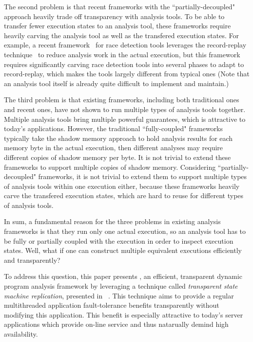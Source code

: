 The second problem is that recent frameworks with the ``partially-decoupled"
approach heavily trade off transparency with analysis tools. To be able to
transfer fewer execution states to an analysis tool, these frameworks require
heavily carving the analysis tool as well as the transfered execution states.
For example, a recent framework~\cite{wester:parallelizing:asplos13} for race
detection tools leverages the record-replay
technique~\cite{scribe:sigmetrics2010, respec:asplos10, racepro:sosp11} to
reduce analysis work in the actual execution, but this framework
requires significantly carving race detection tools into several phases to adapt
to record-replay, which makes the tools largely different from typical ones
(Note that an analysis tool itself is already quite difficult to implement and
maintain.)


The third problem is that existing frameworks, including both traditional ones
and recent ones, have not shown to run multiple types of analysis tools 
together. Multiple analysis tools bring multiple powerful
guarantees, which is attractive to today's applications. However, the
traditional ``fully-coupled" frameworks typically take the shadow memory 
approach to hold analysis results for each memory byte in the actual execution, 
then different analyses may require different copies of shadow memory per byte. 
It is not trivial to extend these frameworks to support multiple copies of 
shadow memory. Considering ``partially-decoupled" frameworks, it is not trivial 
to extend them to support multiple types of analysis tools within one execution 
either, because these frameworks heavily carve the transfered execution states, 
which are hard to reuse for different types of analysis tools.


In sum, a fundamental reason for the three problems in existing analysis 
frameworks is that they run only one actual execution, so an analysis tool has
to be fully or partially coupled with the execution in order to inspect
execution states. Well, what if one can construct multiple equivalent
executions efficiently and transparently?




To address this question, this paper presents \xxx, an efficient, 
transparent dynamic program analysis framework by leveraging a technique called 
\emph{transparent state machine replication}, presented in 
\repbox~\cite{repbox:sosp15}. This technique aims to provide a regular 
multithreaded application fault-tolerance benefits transparently without modifying 
this application. This benefit is especially attractive to today's server applications which 
provide on-line service and thus natarually demind high availability.


